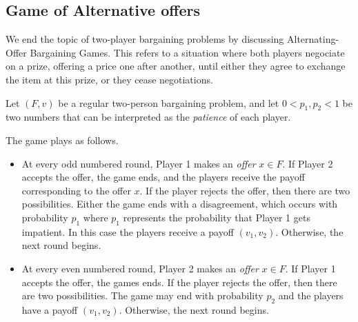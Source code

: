 

\subsection{Game of Alternative offers}

We end the topic of two-player bargaining problems by discussing Alternating-Offer Bargaining Games. This refers to a situation where both players negociate on a prize, offering a price one after another, until either they agree to exchange the item at this prize, or they cease negotiations.

Let $(F,v)$ be a regular two-person bargaining problem, and let $0 < p_1, p_2 < 1$  be two numbers that can be interpreted as the \emph{patience} of each player.

The game plays as follows.
\begin{itemize}
\item At every odd numbered round, Player 1 makes an \emph{offer} $x \in F$. If Player 2 accepts the offer, the game ends, and the players receive the payoff corresponding to the offer $ x $. If the player rejects the offer, then there are two possibilities. Either the game ends with a disagreement, which occurs with probability $p_1$ where $p_1$ represents the probability that Player 1 gets impatient. In this case the players receive a payoff $(v_1,v_2)$. Otherwise, the next round begins.
\item  At every even numbered round, Player 2 makes an \emph{offer} $x \in F$. If Player 1 accepts the offer, the games ends. If the player rejects the offer, then there are two possibilities.
The game  may end with probability $p_2$ and the players have a payoff $(v_1,v_2)$. Otherwise, the next round begins.
\end{itemize}


